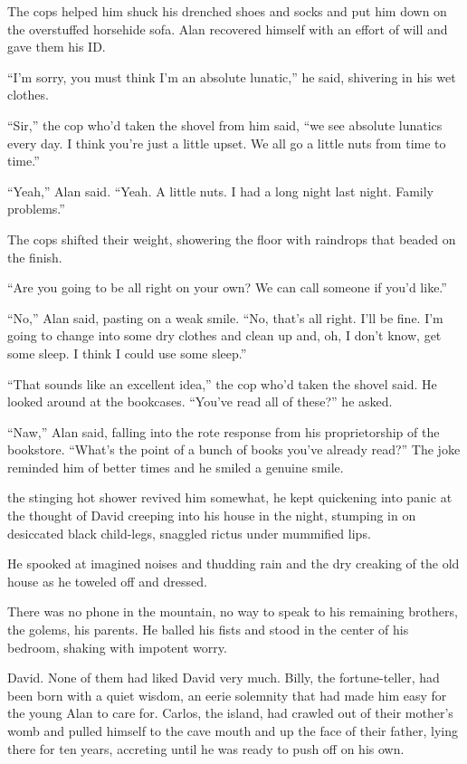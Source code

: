 The cops helped him shuck his drenched shoes and socks and put him
down on the overstuffed horsehide sofa.  Alan recovered himself with
an effort of will and gave them his ID.

``I'm sorry, you must think I'm an absolute lunatic,'' he said,
shivering in his wet clothes.

``Sir,'' the cop who'd taken the shovel from him said, ``we see
absolute lunatics every day.  I think you're just a little upset.  We
all go a little nuts from time to time.''

``Yeah,'' Alan said.  ``Yeah.  A little nuts.  I had a long night last
night.  Family problems.''

The cops shifted their weight, showering the floor with raindrops that
beaded on the finish.

``Are you going to be all right on your own?  We can call someone if
you'd like.''

``No,'' Alan said, pasting on a weak smile.  ``No, that's all right. 
I'll be fine.  I'm going to change into some dry clothes and clean up
and, oh, I don't know, get some sleep.  I think I could use some
sleep.''

``That sounds like an excellent idea,'' the cop who'd taken the shovel
said.  He looked around at the bookcases.  ``You've read all of
these?'' he asked.

``Naw,'' Alan said, falling into the rote response from his
proprietorship of the bookstore.  ``What's the point of a bunch of
books you've already read?'' The joke reminded him of better times and
he smiled a genuine smile.

 the stinging hot shower revived him somewhat, he kept
quickening into panic at the thought of David creeping into his house
in the night, stumping in on desiccated black child-legs, snaggled
rictus under mummified lips.

He spooked at imagined noises and thudding rain and the dry creaking
of the old house as he toweled off and dressed.

There was no phone in the mountain, no way to speak to his remaining
brothers, the golems, his parents.  He balled his fists and stood in
the center of his bedroom, shaking with impotent worry.

David.  None of them had liked David very much.  Billy, the
fortune-teller, had been born with a quiet wisdom, an eerie solemnity
that had made him easy for the young Alan to care for.  Carlos, the
island, had crawled out of their mother's womb and pulled himself to
the cave mouth and up the face of their father, lying there for ten
years, accreting until he was ready to push off on his own.

